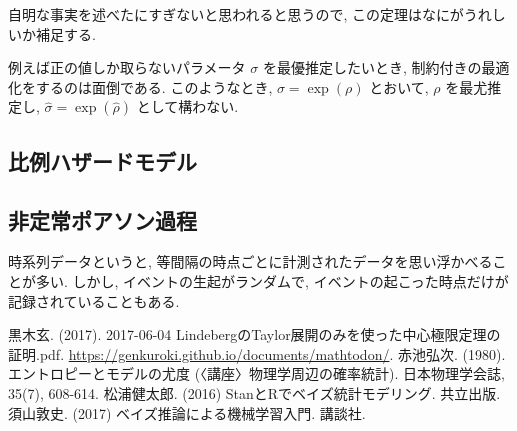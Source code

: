 \documentclass[a4paper, 12pt]{jarticle}
\begin{document}
自明な事実を述べたにすぎないと思われると思うので, この定理はなにがうれしいか補足する.

例えば正の値しか取らないパラメータ $\sigma$ を最優推定したいとき, 制約付きの最適化をするのは面倒である. このようなとき, $\sigma=\exp(\rho)$ とおいて, $\rho$ を最尤推定し, $\hat \sigma =\exp(\hat \rho)$ として構わない. 

\subsection{比例ハザードモデル}

\subsection{非定常ポアソン過程}
時系列データというと, 等間隔の時点ごとに計測されたデータを思い浮かべることが多い. しかし, イベントの生起がランダムで, イベントの起こった時点だけが記録されていることもある. 

\begin{thebibliography}{4}
黒木玄. (2017). 2017-06-04 LindebergのTaylor展開のみを使った中心極限定理の証明.pdf. \url{https://genkuroki.github.io/documents/mathtodon/}.
 赤池弘次. (1980). エントロピーとモデルの尤度 (〈講座〉物理学周辺の確率統計). 日本物理学会誌, 35(7), 608-614.
 松浦健太郎. (2016) StanとRでベイズ統計モデリング. 共立出版.
 須山敦史. (2017) ベイズ推論による機械学習入門. 講談社.
\end{thebibliography}
\end{document}
